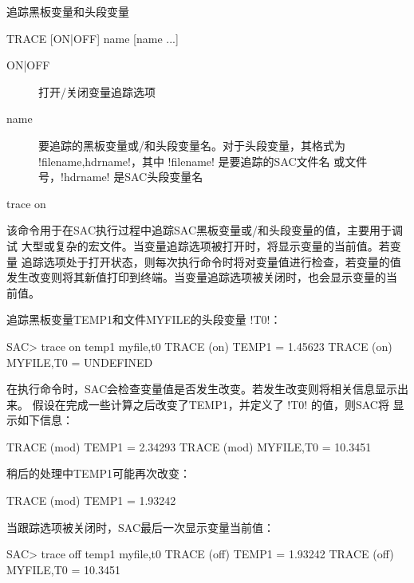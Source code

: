 \label{cmd:trace}

追踪黑板变量和头段变量

\begin{SACSTX}
TRACE [ON|OFF] name [name ...]
\end{SACSTX}

\begin{description}
\item [ON|OFF] 打开/关闭变量追踪选项
\item [name] 要追踪的黑板变量或/和头段变量名。对于头段变量，其格式为
    !filename,hdrname!，其中 !filename! 是要追踪的SAC文件名
    或文件号，!hdrname! 是SAC头段变量名
\end{description}

\begin{SACDFT}
trace on
\end{SACDFT}

该命令用于在SAC执行过程中追踪SAC黑板变量或/和头段变量的值，主要用于调试
大型或复杂的宏文件。当变量追踪选项被打开时，将显示变量的当前值。若变量
追踪选项处于打开状态，则每次执行命令时将对变量值进行检查，若变量的值
发生改变则将其新值打印到终端。当变量追踪选项被关闭时，也会显示变量的当
前值。

追踪黑板变量TEMP1和文件MYFILE的头段变量 !T0!：
\begin{SACCode}
SAC> trace on temp1 myfile,t0
  TRACE  (on) TEMP1 = 1.45623
  TRACE  (on) MYFILE,T0 = UNDEFINED
\end{SACCode}

在执行命令时，SAC会检查变量值是否发生改变。若发生改变则将相关信息显示出来。
假设在完成一些计算之后改变了TEMP1，并定义了 !T0! 的值，则SAC将
显示如下信息：
\begin{SACCode}
  TRACE (mod) TEMP1 = 2.34293
  TRACE (mod) MYFILE,T0 = 10.3451
\end{SACCode}

稍后的处理中TEMP1可能再次改变：
\begin{SACCode}
  TRACE (mod) TEMP1 = 1.93242
\end{SACCode}

当跟踪选项被关闭时，SAC最后一次显示变量当前值：
\begin{SACCode}
SAC> trace off temp1 myfile,t0
  TRACE (off) TEMP1 = 1.93242
  TRACE (off) MYFILE,T0 = 10.3451
\end{SACCode}
